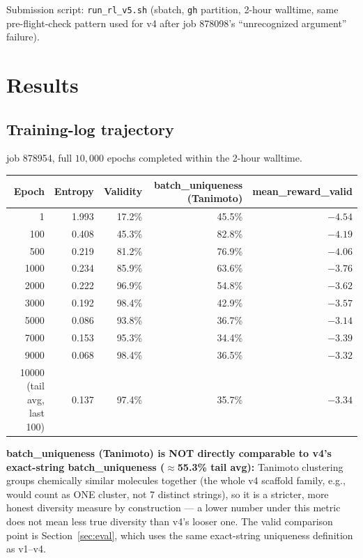 \documentclass[11pt]{article}
\newcommand{\code}[1]{\texttt{#1}}
\begin{document}
Submission script: \code{run\_rl\_v5.sh} (sbatch, \code{gh} partition, 2-hour walltime, same pre-flight-check pattern used for v4 after job 878098's ``unrecognized argument'' failure).

\section{Results}

\subsection{Training-log trajectory}
job 878954, full $10{,}000$ epochs completed within the 2-hour walltime.

\begin{center}
\begin{tabular}{@{}r r r r r@{}}
\toprule
\textbf{Epoch} & \textbf{Entropy} & \textbf{Validity} & \textbf{batch\_uniqueness (Tanimoto)} & \textbf{mean\_reward\_valid} \\
\midrule
1     & 1.993 & 17.2\% & 45.5\% & $-4.54$ \\
100   & 0.408 & 45.3\% & 82.8\% & $-4.19$ \\
500   & 0.219 & 81.2\% & 76.9\% & $-4.06$ \\
1000  & 0.234 & 85.9\% & 63.6\% & $-3.76$ \\
2000  & 0.222 & 96.9\% & 54.8\% & $-3.62$ \\
3000  & 0.192 & 98.4\% & 42.9\% & $-3.57$ \\
5000  & 0.086 & 93.8\% & 36.7\% & $-3.14$ \\
7000  & 0.153 & 95.3\% & 34.4\% & $-3.39$ \\
9000  & 0.068 & 98.4\% & 36.5\% & $-3.32$ \\
10000 (tail avg, last 100) & 0.137 & 97.4\% & 35.7\% & $-3.34$ \\
\bottomrule
\end{tabular}
\end{center}

\textbf{batch\_uniqueness (Tanimoto) is NOT directly comparable to v4's exact-string batch\_uniqueness ($\approx$55.3\% tail avg):} Tanimoto clustering groups chemically similar molecules together (the whole v4 scaffold family, e.g., would count as ONE cluster, not 7 distinct strings), so it is a stricter, more honest diversity measure by construction --- a lower number under this metric does not mean less true diversity than v4's looser one. The valid comparison point is Section~\ref{sec:eval}, which uses the same exact-string uniqueness definition as v1--v4.
\end{document}
